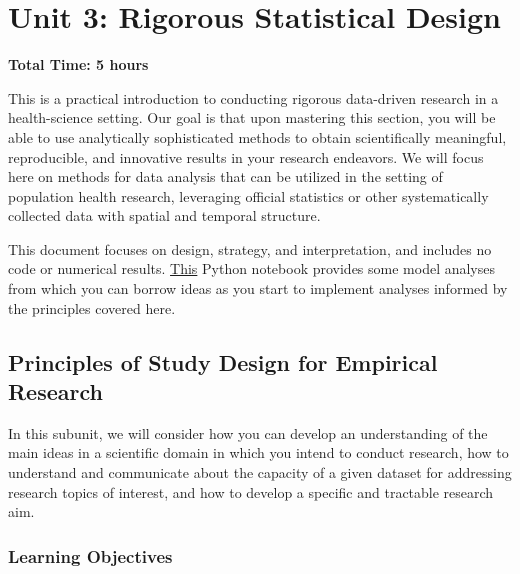 \chapter{Unit 3: Rigorous Statistical Design}
\label{chap:unit3}

\textbf{Total Time: 5 hours}

This is a practical introduction to conducting rigorous data-driven research in a health-science setting.  Our goal is that upon mastering this section, you will be able to use analytically sophisticated methods to obtain scientifically meaningful, reproducible, and innovative results in your research endeavors. We will focus here on methods for data analysis that can be utilized in the setting of population health research, leveraging official statistics or other systematically collected data with spatial and temporal structure.

This document focuses on design, strategy, and interpretation, and includes no code or numerical results.  \href{https://github.com/kshedden/case_studies/blob/main/birthweight/birthweight.ipynb}{This} Python notebook provides some model analyses from which you can borrow ideas as you start to implement analyses informed by the principles covered here.

\section{Principles of Study Design for Empirical Research}
\label{sec:3.1}

In this subunit, we will consider how you can develop an understanding of the main ideas in a scientific domain in which you intend to conduct research, how to understand and communicate about the capacity of a given dataset for addressing research topics of interest, and how to develop a specific and tractable research aim.

\subsection{Learning Objectives}

